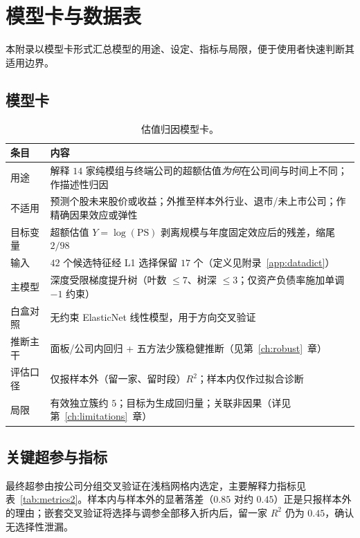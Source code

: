 \documentclass[UTF8, a4paper, fontset=none, zihao=-4]{ctexrep}
\begin{document}
\chapter{模型卡与数据表}\label{app:modelcard}
本附录以模型卡形式汇总模型的用途、设定、指标与局限，便于使用者快速判断其适用边界。

\section{模型卡}
\begin{table}[htbp]
\caption{估值归因模型卡。}
\label{tab:modelcard}
\footnotesize
\renewcommand{\arraystretch}{1.45}
\begin{tabularx}{\textwidth}{@{}lX@{}}
\toprule
\textbf{\color{brandblue}条目} & \textbf{\color{brandblue}内容} \\
\midrule
用途 & 解释 $14$ 家纯模组与终端公司的超额估值\emph{为何}在公司间与时间上不同；作描述性归因 \\
不适用 & 预测个股未来股价或收益；外推至样本外行业、退市/未上市公司；作精确因果效应或弹性 \\
目标变量 & 超额估值 $Y=\log(\text{PS})$ 剥离规模与年度固定效应后的残差，缩尾 $2/98$ \\
输入 & $42$ 个候选特征经 L1 选择保留 $17$ 个（定义见附录~\ref{app:datadict}） \\
主模型 & 深度受限梯度提升树（叶数 $\leq7$、树深 $\leq3$；仅资产负债率施加单调 $-1$ 约束） \\
白盒对照 & 无约束 ElasticNet 线性模型，用于方向交叉验证 \\
推断主干 & 面板/公司内回归 + 五方法少簇稳健推断（见第~\ref{ch:robust}~章） \\
评估口径 & 仅报样本外（留一家、留时段）$R^2$；样本内仅作过拟合诊断 \\
局限 & 有效独立簇约 $5$；目标为生成回归量；关联非因果（详见第~\ref{ch:limitations}~章） \\
\bottomrule
\end{tabularx}
\end{table}

\section{关键超参与指标}
最终超参由按公司分组交叉验证在浅档网格内选定，主要解释力指标见表~\ref{tab:metrics2}。样本内与样本外的显著落差（$0.85$ 对约 $0.45$）正是只报样本外的理由；嵌套交叉验证将选择与调参全部移入折内后，留一家 $R^2$ 仍为 $0.45$，确认无选择性泄漏。
\end{document}

